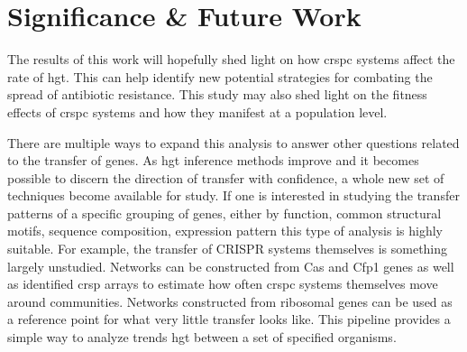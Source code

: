 \section*{\huge Significance \& Future Work}
The results of this work will hopefully shed light on how \ac{crspc} systems affect the rate of \ac{hgt}.
This can help identify new potential strategies for combating the spread of antibiotic resistance.
This study may also shed light on the fitness effects of \ac{crspc} systems and how they manifest at a population level.\par
There are multiple ways to expand this analysis to answer other questions related to the transfer of genes.
As \ac{hgt} inference methods improve and it becomes possible to discern the direction of transfer with confidence, a whole new set of techniques become available for study.
If one is interested in studying the transfer patterns of a specific grouping of genes, either by function, common structural motifs, sequence composition, expression pattern this type of analysis is highly suitable.
For example, the transfer of CRISPR systems themselves is something largely unstudied.
Networks can be constructed from Cas and Cfp1 genes as well as identified \ac{crsp} arrays to estimate how often \ac{crspc} systems themselves move around communities.
Networks constructed from ribosomal genes can be used as a reference point for what very little transfer looks like.
This pipeline provides a simple way to analyze trends \ac{hgt} between a set of specified organisms.
